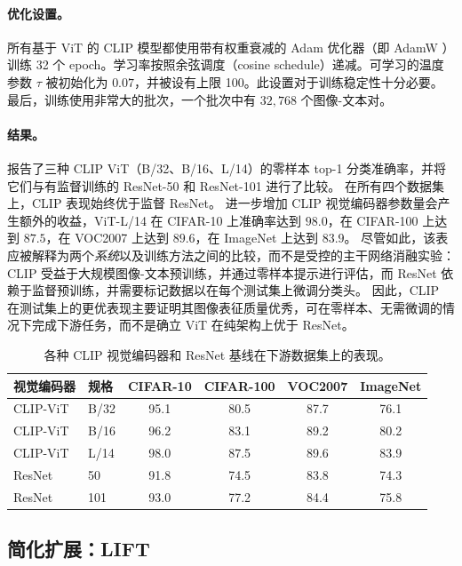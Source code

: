 \documentclass[../../book-main_zh.tex]{subfiles}
\begin{document}
\paragraph{优化设置。}
所有基于 ViT 的 CLIP 模型都使用带有权重衰减的 Adam 优化器（即 AdamW ）训练 32 个 epoch。学习率按照余弦调度（cosine schedule）递减。可学习的温度参数 \(\tau\) 被初始化为 \(0.07\)，并被设有上限 100。此设置对于训练稳定性十分必要。最后，训练使用非常大的批次，一个批次中有 \(32{,}768\) 个图像-文本对。

\paragraph{结果。} 报告了三种 CLIP ViT（B/32、B/16、L/14）的零样本 top-1 分类准确率，并将它们与有监督训练的 ResNet-50 和 ResNet-101 进行了比较。
在所有四个数据集上，CLIP 表现始终优于监督 ResNet。
进一步增加 CLIP 视觉编码器参数量会产生额外的收益，ViT-L/14 在 CIFAR-10 上准确率达到 \(98.0\)，在 CIFAR-100 上达到 \(87.5\)，在 VOC2007 上达到 \(89.6\)，在 ImageNet 上达到 \(83.9\)。
尽管如此，该表应被解释为两个\emph{系统}以及训练方法之间的比较，而不是受控的主干网络消融实验：CLIP 受益于大规模图像-文本预训练，并通过零样本提示进行评估，而 ResNet 依赖于监督预训练，并需要标记数据以在每个测试集上微调分类头。
因此，CLIP 在测试集上的更优表现主要证明其图像表征质量优秀，可在零样本、无需微调的情况下完成下游任务，而不是确立 ViT 在纯架构上优于 ResNet。

\begin{table}[t]
\centering
\begin{tabular}{@{}llcccc@{}}
\toprule
视觉编码器 & 规格 & CIFAR-10 & CIFAR-100 & VOC2007 & ImageNet \\
\midrule
CLIP-ViT & B/32 & 95.1 & 80.5 & 87.7 & 76.1 \\
CLIP-ViT & B/16 & 96.2 & 83.1 & 89.2 & 80.2 \\
CLIP-ViT & L/14 & 98.0 & 87.5 & 89.6 & 83.9 \\
\midrule
ResNet & 50  & 91.8 & 74.5 & 83.8 & 74.3 \\
ResNet & 101 & 93.0 & 77.2 & 84.4 & 75.8 \\
\bottomrule
\end{tabular}
\caption{各种 CLIP 视觉编码器和 ResNet 基线在下游数据集上的表现。}
\label{tab:clip_vs_resnet}
\end{table}

\subsection{简化扩展：LIFT}\label{sub:follow-up}
\end{document}
